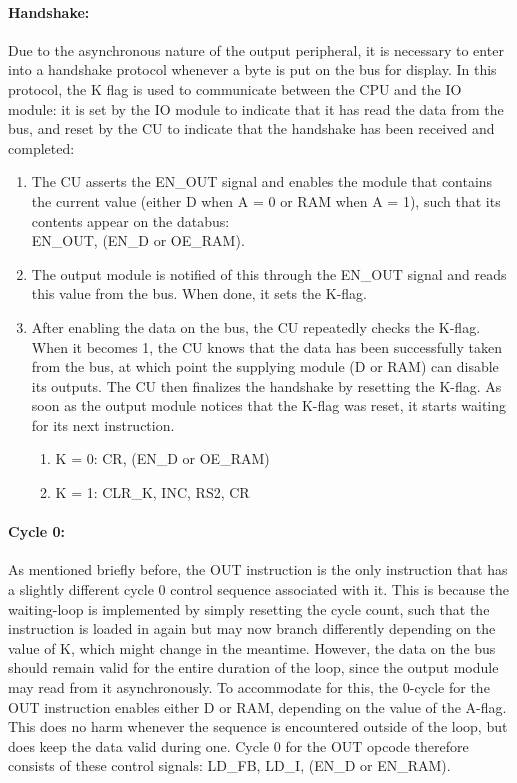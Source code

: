 \paragraph{Handshake:} Due to the asynchronous nature of the output peripheral, it is necessary to enter into a handshake protocol whenever a byte is put on the bus for display. In this protocol, the K flag is used to communicate between the CPU and the IO module: it is set by the IO module to indicate that it has read the data from the bus, and reset by the CU to indicate that the handshake has been received and completed:

\begin{enumerate}
\item The CU asserts the EN\_OUT signal and enables the module that contains the current value (either D when A = 0 or RAM when A = 1), such that its contents appear on the databus:\\EN\_OUT, (EN\_D or OE\_RAM).
\item The output module is notified of this through the EN\_OUT signal and reads this value from the bus. When done, it sets the K-flag.
\item After enabling the data on the bus, the CU repeatedly checks the K-flag. When it becomes 1, the CU knows that the data has been successfully taken from the bus, at which point the supplying module (D or RAM) can disable its outputs. The CU then finalizes the handshake by resetting the K-flag. As soon as the output module notices that the K-flag was reset, it starts waiting for its next instruction.
  \begin{enumerate}
  \item K = 0: CR, (EN\_D or OE\_RAM)
  \item K = 1: CLR\_K, INC, RS2, CR   
  \end{enumerate}
\end{enumerate}


\paragraph{Cycle 0:} As mentioned briefly before, the OUT instruction is the only instruction that has a slightly different cycle 0 control sequence associated with it. This is because the waiting-loop is implemented by simply resetting the cycle count, such that the instruction is loaded in again but may now branch differently depending on the value of K, which might change in the meantime. However, the data on the bus should remain valid for the entire duration of the loop, since the output module may read from it asynchronously. To accommodate for this, the 0-cycle for the OUT instruction enables either D or RAM, depending on the value of the A-flag. This does no harm whenever the sequence is encountered outside of the loop, but does keep the data valid during one. Cycle 0 for the OUT opcode therefore consists of these control signals: LD\_FB, LD\_I, (EN\_D or EN\_RAM).

